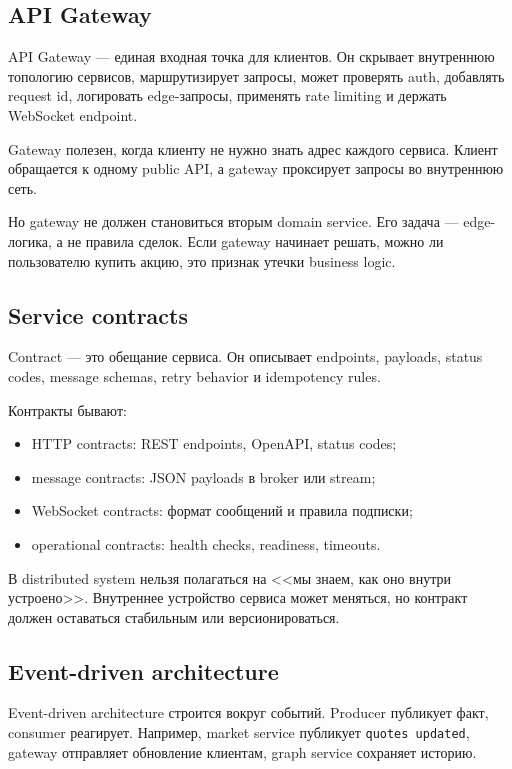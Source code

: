 \documentclass[12pt,a4paper]{article}
\begin{document}
\subsection{API Gateway}

API Gateway --- единая входная точка для клиентов. Он скрывает внутреннюю
топологию сервисов, маршрутизирует запросы, может проверять auth, добавлять
request id, логировать edge-запросы, применять rate limiting и держать WebSocket
endpoint.

Gateway полезен, когда клиенту не нужно знать адрес каждого сервиса. Клиент
обращается к одному public API, а gateway проксирует запросы во внутреннюю сеть.

Но gateway не должен становиться вторым domain service. Его задача --- edge-логика,
а не правила сделок. Если gateway начинает решать, можно ли пользователю купить
акцию, это признак утечки business logic.

\subsection{Service contracts}

Contract --- это обещание сервиса. Он описывает endpoints, payloads, status codes,
message schemas, retry behavior и idempotency rules.

Контракты бывают:
\begin{itemize}
    \item HTTP contracts: REST endpoints, OpenAPI, status codes;
    \item message contracts: JSON payloads в broker или stream;
    \item WebSocket contracts: формат сообщений и правила подписки;
    \item operational contracts: health checks, readiness, timeouts.
\end{itemize}

В distributed system нельзя полагаться на <<мы знаем, как оно внутри устроено>>.
Внутреннее устройство сервиса может меняться, но контракт должен оставаться
стабильным или версионироваться.

\subsection{Event-driven architecture}

Event-driven architecture строится вокруг событий. Producer публикует факт,
consumer реагирует. Например, market service публикует \texttt{quotes updated},
gateway отправляет обновление клиентам, graph service сохраняет историю.
\end{document}
